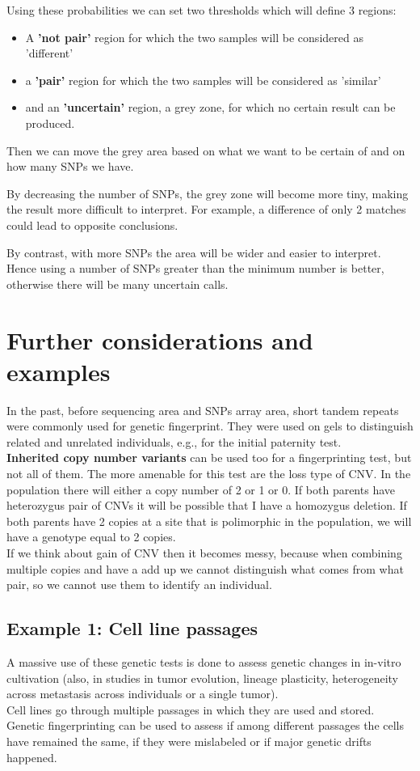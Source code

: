 Using these probabilities we can set two thresholds which will define 3 regions:
\begin{itemize}
	\item A \textbf{'not pair'} region for which the two samples will be considered as 'different'
 	\item a \textbf{'pair'} region for which the two samples will be considered as 'similar'
	\item and an \textbf{'uncertain'} region, a grey zone, for which no certain result can be produced.
\end{itemize}

Then we can move the grey area based on what we want to be certain of and on how many SNPs we have.

By decreasing the number of SNPs, the grey zone will become more tiny, making the result more difficult to interpret. For example, a difference of only 2 matches could lead to opposite conclusions.

By contrast, with more SNPs the area will be wider and easier to interpret. Hence using a number of SNPs greater than the minimum number is better, otherwise there will be many uncertain calls.


\section*{Further considerations and examples}
In the past, before sequencing area and SNPs array area, short tandem repeats were commonly used for genetic fingerprint. They were used on gels to distinguish related and unrelated individuals, e.g., for the initial paternity test.
\\
\textbf{Inherited copy number variants} can be used too for a fingerprinting test, but not all of them. The more amenable for this test are the loss type of CNV. In the population there will either a copy number of 2 or 1 or 0. If both parents have heterozygus pair of CNVs it will be possible that I have a homozygus deletion. If both parents have 2 copies at a site that is polimorphic in the population, we will have a genotype equal to 2 copies.
\\
If we think about gain of CNV then it becomes messy, because when combining multiple copies and have a add up we cannot distinguish what comes from what pair, so we cannot use them to identify an individual.

\subsection{Example 1: Cell line passages}
A massive use of these genetic tests is done to assess genetic changes in in-vitro cultivation (also, in studies in tumor evolution, lineage plasticity, heterogeneity across metastasis across individuals or a single tumor).\\
Cell lines go through multiple passages in which they are used and stored. Genetic fingerprinting can be used to assess if among different passages the cells have remained the same, if they were mislabeled or if major genetic drifts happened.

